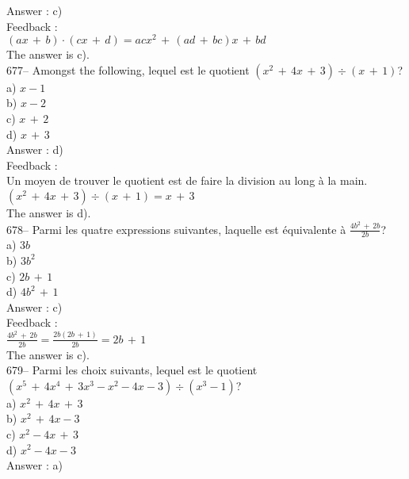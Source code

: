 ﻿\documentclass[letterpaper, 12pt]{article}
\begin{document}
Answer : c)\\

Feedback : \\
$\left( ax\,+\,b\right) \cdot\left( cx\,+\,d\right) =acx^2\,+\,\left(
ad\,+\,bc\right)x \,+\,bd$\\
The answer is c).\\

677-- Amongst the following, lequel est le quotient $\left(
x^{2}\,+\,4x\,+\,3\right) \div \left( x\,+\,1\right)$?\\
a) $x-1$\\
b) $x-2$ \\
c) $x\,+\,2$\\
d) $x\,+\,3$\\

Answer : d)\\

Feedback : \\
Un moyen de trouver le quotient est de faire la division au long \`a la
main.\\
$\left( x^{2}\,+\,4x\,+\,3\right) \div \left( x\,+\,1\right)= x\,+\,3$\\
The answer is d).\\

678-- Parmi les quatre expressions suivantes, laquelle est \'equivalente \`a
$\frac{4b^{2}\,+\,2b}{2b}$?\\
a) $3b$\\
b) $3b^{2}$\\
c) $2b\,+\,1$\\
d) $4b^{2}\,+\,1$\\

Answer : c)\\

Feedback : \\[2mm]
$\frac{4b^{2}\,+\,2b}{2b}=\frac{2b\left(2b\,+\,1 \right)
}{2b}=2b\,+\,1$\\[2mm]
The answer is c).\\

679-- Parmi les choix suivants, lequel est le quotient $\left(
x^{5}\,+\,4x^{4}\,+\,3x^{3}-x^{2}-4x-3\right) \div\left( x^{3}-1\right) $?\\
a) $x^{2}\,+\,4x\,+\,3$\\
b) $x^{2}\,+\,4x-3$\\
c) $x^{2}-4x\,+\,3$\\
d) $x^{2}-4x-3$\\

Answer : a)\\
\end{document}

